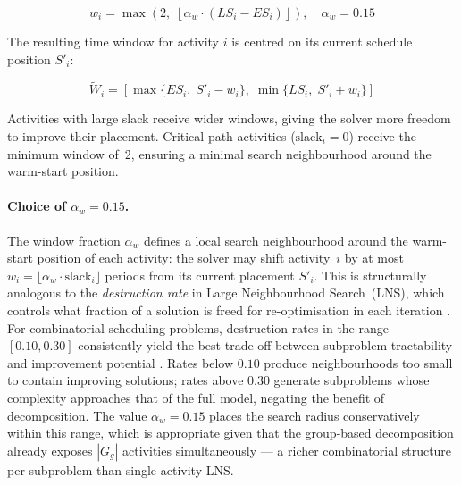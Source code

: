 \begin{equation}
    w_i = \max\!\left(2,\;
    \left\lfloor \alpha_w \cdot (LS_i - ES_i) \right\rfloor\right),
    \quad \alpha_w = 0.15
    \label{eq:slack_window}
\end{equation}

The resulting time window for activity $i$ is centred on its
current schedule position $S'_i$:

\begin{equation}
    \widetilde{W}_i = \left[
    \max\{ES_i,\; S'_i - w_i\},\;
    \min\{LS_i,\; S'_i + w_i\}
    \right]
    \label{eq:group_window}
\end{equation}

Activities with large slack receive wider windows, giving the
solver more freedom to improve their placement. Critical-path
activities ($\mathrm{slack}_i = 0$) receive the minimum window
of~2, ensuring a minimal search neighbourhood around the
warm-start position.

\paragraph{Choice of $\alpha_w = 0.15$.}
The window fraction $\alpha_w$ defines a local search neighbourhood
around the warm-start position of each activity: the solver may
shift activity~$i$ by at most $w_i = \lfloor \alpha_w \cdot
\mathrm{slack}_i \rfloor$ periods from its current placement
$S'_i$. This is structurally analogous to the
\emph{destruction rate} in Large Neighbourhood Search~(LNS),
which controls what fraction of a solution is freed for
re-optimisation in each iteration \parencite{Pisinger2010}.
For combinatorial scheduling problems, destruction rates in the
range $[0.10, 0.30]$ consistently yield the best trade-off
between subproblem tractability and improvement potential
\parencite{Ropke2006, Pisinger2010}. Rates below $0.10$ produce
neighbourhoods too small to contain improving solutions; rates
above $0.30$ generate subproblems whose complexity approaches
that of the full model, negating the benefit of decomposition.
The value $\alpha_w = 0.15$ places the search radius conservatively
within this range, which is appropriate given that the group-based
decomposition already exposes $|G_g|$ activities simultaneously
--- a richer combinatorial structure per subproblem than
single-activity LNS.

